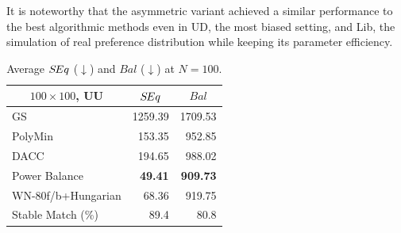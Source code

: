 It is noteworthy that the asymmetric variant achieved a similar performance to the best algorithmic methods even in UD, the most biased setting, and Lib, the simulation of real preference distribution while keeping its parameter efficiency. %

\begin{table}
\centering
{    \small
    \setlength\tabcolsep{4pt} %
    \begin{tabular}{lrr}
    \toprule
        \multicolumn{1}{c}{$100\times100$, UU} & \multicolumn{1}{c}{$S\hspace{-0.1em}Eq$} & \multicolumn{1}{c}{$Bal$}  \\
        \midrule
        GS  & 1259.39 & 1709.53 \\  %
        PolyMin  & 153.35 & 952.85 \\  %
        DACC  & 194.65 & 988.02 \\  %
        Power Balance & {\bf 49.41} & {\bf 909.73} \\  %
        \midrule
        WN-80f/b+Hungarian & 68.36 & 919.75     \\  %
        Stable Match (\%) & 89.4 & 80.8 \\
        \bottomrule
    \end{tabular}
}
    \caption{Average $S\hspace{-0.1em}Eq$ ($\downarrow$) and $Bal$ ($\downarrow$) at $N=100$.}%
    \label{tab:N100_score}
\end{table}


